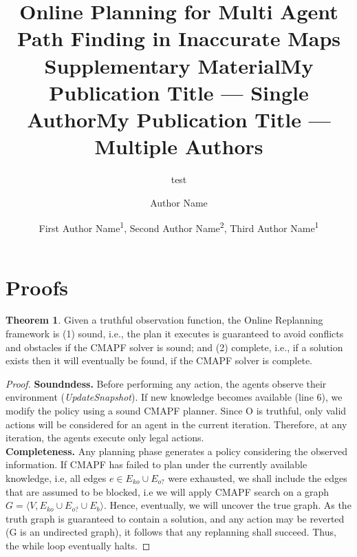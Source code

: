 \documentclass[letterpaper]{article} %
\title{Online Planning for Multi Agent Path Finding in Inaccurate Maps\\ Supplementary Material}
\author{
    test
}
\title{My Publication Title --- Single Author}
\author {
    Author Name
}
\title{My Publication Title --- Multiple Authors}
\author {
    First Author Name\textsuperscript{\rm 1},
    Second Author Name\textsuperscript{\rm 2},
    Third Author Name\textsuperscript{\rm 1}
}
\def\
UrlFont{\rm}  %
\newcommand{\eb}{E_{b}} %
\newcommand{\eko}{E_{ko}} %
\newcommand{\eao}{E_{o?}} %
\theoremstyle{definition}
\newtheorem{theorem}{Theorem}
\begin{document}
\maketitle
\section{Proofs}


\begin{theorem}
Given a truthful observation function, 
the Online Replanning framework is (1) sound, i.e., the plan it executes is guaranteed to avoid conflicts and obstacles if the CMAPF solver is sound; and (2) complete, i.e., if a solution exists then it will eventually be found, if the CMAPF solver is complete.
\end{theorem}
\begin{proof}
\noindent \textbf{Soundndess.} Before performing any action, the agents observe their environment (\emph{UpdateSnapshot}). If new knowledge becomes available (line 6), we modify the policy using a sound CMAPF planner. Since O is truthful, only valid actions will be considered for an agent in the current iteration. Therefore, at any iteration, the agents execute only legal actions.\\

\noindent\textbf{Completeness.} 
    Any planning phase generates a policy considering the observed information. If CMAPF has failed to plan under the currently available knowledge, i.e, all edges $e \in \eko \cup \eao$ were exhausted, we shall include the edges that are assumed to be blocked, i.e we will apply CMAPF search on a graph $G=\langle V,  \eko \cup \eao \cup \eb \rangle $. Hence, eventually, we will uncover the true graph. As the truth graph is guaranteed to contain a solution, and any action may be reverted (G is an undirected graph), it follows that any replanning shall succeed. Thus, the while loop eventually halts.
\end{proof}
\end{document}
